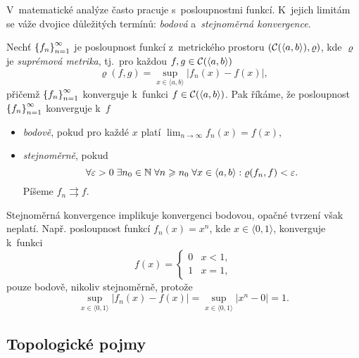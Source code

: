 V~matematické analýze často pracuje s~posloupnostmi funkcí. K~jejich limitám se váže dvojice důležitých termínů: \emph{bodová} a~\emph{stejnoměrná konvergence}.
\begin{definition}\label{def:bodova-stejnomerna-konvergence}
    Nechť $\left\{f_n\right\}_{n=1}^\infty$ je posloupnost funkcí z~metrického prostoru $(\mathcal{C}(\langle a,b\rangle),\varrho)$, kde $\varrho$ je \emph{suprémová metrika}, tj.~pro každou $f,g\in \mathcal{C}(\langle a,b\rangle)$
    \[\varrho(f,g)=\sup_{x\in\langle a,b\rangle}|f_n(x)-f(x)|,\]
    přičemž $\left\{f_n\right\}_{n=1}^\infty$ konverguje k~funkci $f\in \mathcal{C}(\langle a,b\rangle)$.
    Pak říkáme, že posloupnost $\left\{f_n\right\}_{n=1}^\infty$ konverguje k~$f$
    \begin{itemize}
        \item \emph{bodově}, pokud pro každé $x$ platí $\lim_{n\to\infty}f_n(x)=f(x)$,
        \item \emph{stejnoměrně}, pokud
        \[\forall\varepsilon>0\;\exists n_0\in\mathbb{N}\;\forall n\geqslant n_0\;\forall x\in\langle a,b\rangle: \varrho(f_n,f)<\varepsilon.\]
        Píšeme $f_n\rightrightarrows f$.
    \end{itemize}
\end{definition}
Stejnoměrná konvergence implikuje konvergenci bodovou, opačné tvrzení však neplatí. Např. posloupnost funkcí $f_n(x)=x^n$, kde $x\in\langle 0,1\rangle$, konverguje k~funkci 
\[f(x)=\begin{cases}
    0 & x < 1,\\
    1 & x = 1,
\end{cases}\]
pouze bodově, nikoliv stejnoměrně, protože
\[\sup_{x\in\langle 0,1\rangle}|f_n(x)-f(x)|=\sup_{x\in\langle 0,1\rangle}|x^n-0|=1.\]

\subsection{Topologické pojmy}\label{subsec:topologicke-pojmy}

